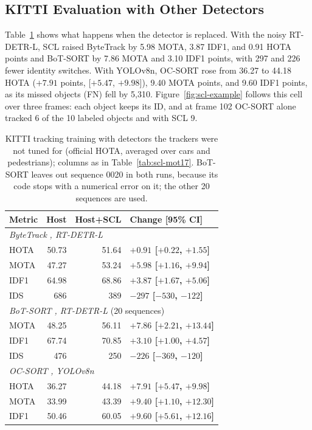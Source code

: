 \subsection{KITTI Evaluation with Other Detectors}\label{sec:scl-res-kitti}
Table~\ref{tab:scl-kitti} shows what happens when the detector is replaced. With the noisy RT-DETR-L, SCL raised ByteTrack by 5.98 MOTA, 3.87 IDF1, and 0.91 HOTA points and BoT-SORT by 7.86 MOTA and 3.10 IDF1 points, with 297 and 226 fewer identity switches. With YOLOv8n, OC-SORT rose from 36.27 to 44.18 HOTA ($+7.91$ points, [$+5.47$, $+9.98$]), 9.40 MOTA points, and 9.60 IDF1 points, as its missed objects (FN) fell by 5,310. Figure~\ref{fig:scl-example} follows this cell over three frames: each object keeps its ID, and at frame 102 OC-SORT alone tracked 6 of the 10 labeled objects and with SCL 9.

\begin{table}[tbp]
\centering
\caption{KITTI tracking training with detectors the trackers were not tuned for (official HOTA, averaged over cars and pedestrians); columns as in Table~\ref{tab:scl-mot17}. BoT-SORT leaves out sequence 0020 in both runs, because its code stops with a numerical error on it; the other 20 sequences are used.}
\label{tab:scl-kitti}
\begin{tabular}{lrrl}
\toprule
Metric & Host & Host+SCL & Change [95\% CI]\\
\midrule
\multicolumn{4}{l}{\textit{ByteTrack} \cite{zhang2022bytetrack}\textit{, RT-DETR-L}}\\
\quad HOTA & 50.73 & 51.64 & \textbf{$+0.91$ [$+0.22$, $+1.55$]}\\
\quad MOTA & 47.27 & 53.24 & \textbf{$+5.98$ [$+1.16$, $+9.94$]}\\
\quad IDF1 & 64.98 & 68.86 & \textbf{$+3.87$ [$+1.67$, $+5.06$]}\\
\quad IDS & 686 & 389 & \textbf{$-297$ [$-530$, $-122$]}\\
\multicolumn{4}{l}{\textit{BoT-SORT} \cite{aharon2022botsort}\textit{, RT-DETR-L} (20 sequences)}\\
\quad MOTA & 48.25 & 56.11 & \textbf{$+7.86$ [$+2.21$, $+13.44$]}\\
\quad IDF1 & 67.74 & 70.85 & \textbf{$+3.10$ [$+1.00$, $+4.57$]}\\
\quad IDS & 476 & 250 & \textbf{$-226$ [$-369$, $-120$]}\\
\multicolumn{4}{l}{\textit{OC-SORT} \cite{cao2023ocsort}\textit{, YOLOv8n}}\\
\quad HOTA & 36.27 & 44.18 & \textbf{$+7.91$ [$+5.47$, $+9.98$]}\\
\quad MOTA & 33.99 & 43.39 & \textbf{$+9.40$ [$+1.10$, $+12.30$]}\\
\quad IDF1 & 50.46 & 60.05 & \textbf{$+9.60$ [$+5.61$, $+12.16$]}\\
\bottomrule
\end{tabular}
\end{table}

